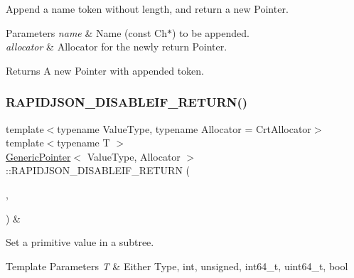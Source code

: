 Append a name token without length, and return a new Pointer. 


\begin{DoxyParams}{Parameters}
{\em name} & Name (const Ch$\ast$) to be appended. \\
\hline
{\em allocator} & Allocator for the newly return Pointer. \\
\hline
\end{DoxyParams}
\begin{DoxyReturn}{Returns}
A new Pointer with appended token. 
\end{DoxyReturn}
\mbox{\label{classGenericPointer_a914bbdd96e2a248e035b8ebd68526369}} 
\subsubsection{\texorpdfstring{R\+A\+P\+I\+D\+J\+S\+O\+N\+\_\+\+D\+I\+S\+A\+B\+L\+E\+I\+F\+\_\+\+R\+E\+T\+U\+R\+N()}{RAPIDJSON\_DISABLEIF\_RETURN()}\hspace{0.1cm}{\footnotesize\ttfamily [2/3]}}
{\footnotesize\ttfamily template$<$typename Value\+Type, typename Allocator = Crt\+Allocator$>$ \\
template$<$typename T $>$ \\
\hyperlink{classGenericPointer}{Generic\+Pointer}$<$ Value\+Type, Allocator $>$\+::R\+A\+P\+I\+D\+J\+S\+O\+N\+\_\+\+D\+I\+S\+A\+B\+L\+E\+I\+F\+\_\+\+R\+E\+T\+U\+RN (\begin{DoxyParamCaption}\item[{(internal\+::\+Or\+Expr$<$ internal\+::\+Is\+Pointer$<$ T $>$, \hyperlink{structinternal_1_1IsGenericValue}{internal\+::\+Is\+Generic\+Value}$<$ T $>$ $>$)}]{,  }\item[{(Value\+Type \&)}]{ }\end{DoxyParamCaption}) \&}



Set a primitive value in a subtree. 


\begin{DoxyTemplParams}{Template Parameters}
{\em T} & Either Type, {\ttfamily int}, {\ttfamily unsigned}, {\ttfamily int64\+\_\+t}, {\ttfamily uint64\+\_\+t}, {\ttfamily bool} \\
\hline
\end{DoxyTemplParams}
\mbox{\label{classGenericPointer_a1bb4a253f33687734e5b20795632a801}} 
